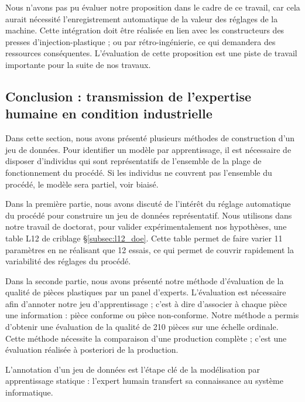 Nous n'avons pas pu évaluer notre proposition dans le cadre de ce travail, car cela aurait nécessité l'enregistrement automatique de la valeur des réglages de la machine.
Cette intégration doit être réalisée en lien avec les constructeurs des presses d'injection-plastique ; ou par rétro-ingénierie, ce qui demandera des ressources conséquentes.
L'évaluation de cette proposition est une piste de travail importante pour la suite de nos travaux.


\subsection{Conclusion : transmission de l'expertise humaine en condition industrielle} \label{sec:dataset_conclusion}
Dans cette section, nous avons présenté plusieurs méthodes de construction d'un jeu de données.
Pour identifier un modèle par apprentissage, il est nécessaire de disposer d'individus qui sont représentatifs de l'ensemble de la plage de fonctionnement du procédé.
Si les individus ne couvrent pas l'ensemble du procédé, le modèle sera partiel, voir biaisé.

Dans la première partie, nous avons discuté de l'intérêt du réglage automatique du procédé pour construire un jeu de données représentatif.
Nous utilisons dans notre travail de doctorat, pour valider expérimentalement nos hypothèses, une table L12 de criblage §\ref{subsec:l12_doe}.
Cette table permet de faire varier 11 paramètres en ne réalisant que 12 essais, ce qui permet de couvrir rapidement la variabilité des réglages du procédé.

Dans la seconde partie, nous avons présenté notre méthode d'évaluation de la qualité de pièces plastiques par un panel d'experts.
L'évaluation est nécessaire afin d'annoter notre jeu d'apprentissage ; c'est à dire d'associer à chaque pièce une information : pièce conforme ou pièce non-conforme.
Notre méthode a permis d'obtenir une évaluation de la qualité de 210 pièces sur une échelle ordinale.
Cette méthode nécessite la comparaison d'une production complète ; c'est une évaluation réalisée à posteriori de la production.

L'annotation d'un jeu de données est l'étape clé de la modélisation par apprentissage statique : l'expert humain transfert sa connaissance au système informatique.

